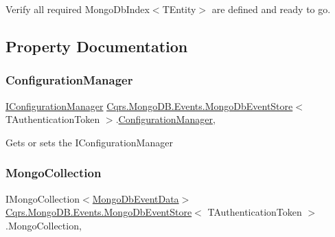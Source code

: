 Verify all required Mongo\+Db\+Index$<$\+T\+Entity$>$ are defined and ready to go. 



\subsection{Property Documentation}
\mbox{\label{classCqrs_1_1MongoDB_1_1Events_1_1MongoDbEventStore_a2944d6e589401531ba4283b984140c0e_a2944d6e589401531ba4283b984140c0e}} 
\subsubsection{\texorpdfstring{Configuration\+Manager}{ConfigurationManager}}
{\footnotesize\ttfamily \hyperlink{interfaceCqrs_1_1Configuration_1_1IConfigurationManager}{I\+Configuration\+Manager} \hyperlink{classCqrs_1_1MongoDB_1_1Events_1_1MongoDbEventStore}{Cqrs.\+Mongo\+D\+B.\+Events.\+Mongo\+Db\+Event\+Store}$<$ T\+Authentication\+Token $>$.\hyperlink{classCqrs_1_1Configuration_1_1ConfigurationManager}{Configuration\+Manager}\hspace{0.3cm}{\ttfamily [get]}, {\ttfamily [protected]}}



Gets or sets the I\+Configuration\+Manager 

\mbox{\label{classCqrs_1_1MongoDB_1_1Events_1_1MongoDbEventStore_af2dfb3af9b76e8b1cab0f7dc68cdc377_af2dfb3af9b76e8b1cab0f7dc68cdc377}} 
\subsubsection{\texorpdfstring{Mongo\+Collection}{MongoCollection}}
{\footnotesize\ttfamily I\+Mongo\+Collection$<$\hyperlink{classCqrs_1_1MongoDB_1_1Events_1_1MongoDbEventData}{Mongo\+Db\+Event\+Data}$>$ \hyperlink{classCqrs_1_1MongoDB_1_1Events_1_1MongoDbEventStore}{Cqrs.\+Mongo\+D\+B.\+Events.\+Mongo\+Db\+Event\+Store}$<$ T\+Authentication\+Token $>$.Mongo\+Collection\hspace{0.3cm}{\ttfamily [get]}, {\ttfamily [protected]}}



